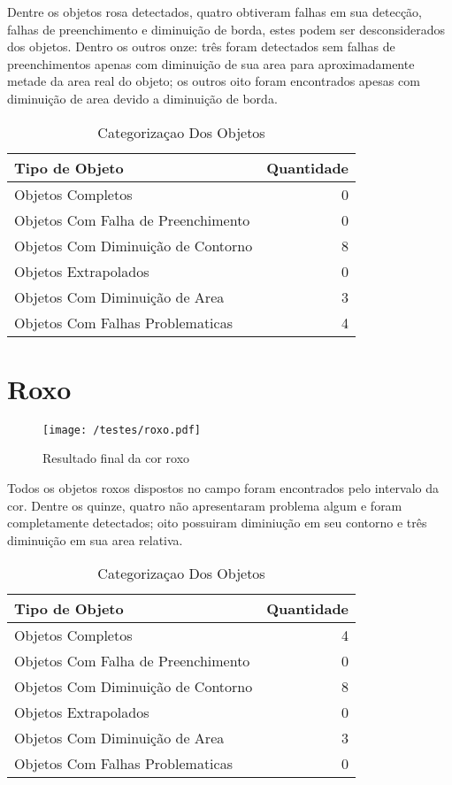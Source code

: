 Dentre os objetos rosa detectados, quatro obtiveram falhas em sua detecção, falhas de preenchimento e diminuição de borda, estes podem ser desconsiderados dos objetos. Dentro os outros onze: três foram detectados sem falhas de preenchimentos apenas com diminuição de sua area para aproximadamente metade da area real do objeto; os outros oito foram encontrados apesas com diminuição de area devido a diminuição de borda.
	
	\begin{table}[h]
\centering
\begin{tabular}{l|r}
Tipo de Objeto & Quantidade \\ %
\hline                               %
Objetos Completos &  0\\
\hline 
Objetos Com Falha de Preenchimento & 0\\
\hline 
Objetos Com Diminuição de Contorno & 8 \\
\hline 
Objetos Extrapolados & 0 \\
\hline 
Objetos Com Diminuição de Area & 3\\
\hline 
Objetos Com Falhas Problematicas & 4 \\
\hline 
\end{tabular}
\caption{Categorizaçao Dos Objetos}
\end{table}

\section{Roxo}
	\begin{figure}[H]
		\centering
		\texttt{[image: /testes/roxo.pdf]}
		\caption{Resultado final da cor roxo}
		\label{disposicaoparte}
	\end{figure}

Todos os objetos roxos dispostos no campo foram encontrados pelo intervalo da cor. Dentre os quinze, quatro não apresentaram problema algum e foram completamente detectados; oito possuiram diminiução em seu contorno e três diminuição em sua area relativa.
\begin{table}[h]
\centering
\begin{tabular}{l|r}
Tipo de Objeto & Quantidade \\ %
\hline                               %
Objetos Completos &  4\\
\hline 
Objetos Com Falha de Preenchimento & 0 \\
\hline 
Objetos Com Diminuição de Contorno &  8 \\
\hline 
Objetos Extrapolados & 0 \\
\hline 
Objetos Com Diminuição de Area & 3 \\
\hline 
Objetos Com Falhas Problematicas & 0 \\
\hline 
\end{tabular}
\caption{Categorizaçao Dos Objetos}
\end{table}
	
